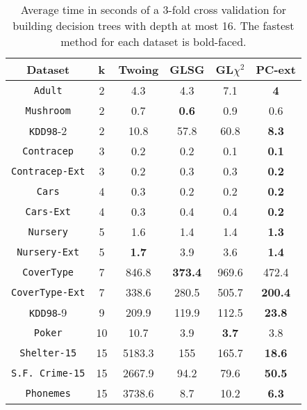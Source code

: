 \begin{table}[]
\small
\caption{Average time in seconds of a 3-fold cross validation
for building decision trees with depth at most 16.
The fastest method for each dataset is bold-faced.}
\centering
\begin{tabular}{c|c|c|c|c|c}
Dataset             & k  & Twoing        & GLSG      & GL$\chi^2$  & PC-ext    \\ \hline
{\tt Adult}         & 2  & 4.3           & 4.3       & 7.1         &{\bf 4}    \\
{\tt Mushroom}      & 2  & 0.7           & {\bf 0.6} & 0.9         & 0.6       \\
{\tt KDD98}-2       & 2  & 10.8          & 57.8      & 60.8        &{\bf 8.3}  \\
{\tt Contracep}     & 3  & 0.2           & 0.2       & 0.1         &{\bf 0.1}  \\
{\tt Contracep-Ext} & 3  & 0.2           & 0.3       & 0.3         &{\bf 0.2}  \\
{\tt Cars}          & 4  & 0.3           & 0.2       & 0.2         &{\bf 0.2}  \\
{\tt Cars-Ext}      & 4  & 0.3           & 0.4       & 0.4         &{\bf 0.2}  \\
{\tt Nursery}       & 5  & 1.6           & 1.4       & 1.4         &{\bf 1.3}  \\
{\tt Nursery-Ext}   & 5  & {\bf 1.7}     & 3.9       & 3.6         &{\bf 1.4}  \\
{\tt CoverType}     & 7  & 846.8         &{\bf 373.4}& 969.6       & 472.4     \\
{\tt CoverType-Ext} & 7  & 338.6         & 280.5     & 505.7       &{\bf 200.4}\\
{\tt KDD98}-9       & 9  & 209.9         & 119.9     & 112.5       &{\bf 23.8} \\
{\tt Poker}         & 10 & 10.7          & 3.9       & {\bf 3.7}   & 3.8       \\ 
{\tt Shelter-15}    & 15 & 5183.3        & 155       & 165.7       &{\bf 18.6} \\   
{\tt S.F. Crime-15} & 15 & 2667.9        & 94.2      & 79.6        &{\bf 50.5} \\ 
{\tt Phonemes}      & 15 & 3738.6        & 8.7       & 10.2        &{\bf 6.3}
\end{tabular}
\label{tab:time-16}
\end{table}


